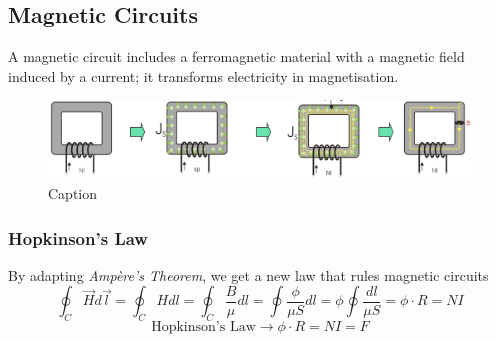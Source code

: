 \documentclass[a4paper]{article}
\begin{document}
\subsection{Magnetic Circuits}
\setcounter{equation}{0}
A magnetic circuit includes a ferromagnetic material with a magnetic field induced by a current; it transforms electricity in magnetisation.

\begin{figure}[H]
    \centering
    \includegraphics[width=\textwidth]{IMG/mag_circuit.png}
    \caption{Caption}
    \label{fig:enter-label}
\end{figure}

\subsubsection{Hopkinson's Law}
\setcounter{equation}{0}
By adapting \textit{Ampère's Theorem}, we get a new law that rules magnetic circuits
$$
\oint_{C}\vec{H}d\vec{l}=\oint_{C}Hdl=\oint_{C}\frac{B}{\mu}dl=\oint \frac{\phi}{\mu S}dl=\phi \oint \frac{dl}{\mu S}=\phi \cdot R=NI
$$
$$
\text{Hopkinson's Law}\to \boxed{\phi \cdot R=NI=F}
$$
\end{document}
